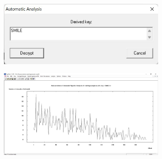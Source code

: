 \documentclass{article}
\begin{document}
\begin{figure}[H]
    \centering
    \includegraphics[width=0.75\textwidth]{figures/4c.jpg}
    \caption
	{}
    \label{fig:fig1}
\end{figure}

\begin{figure}[H]
    \centering
    \includegraphics[width=0.75\textwidth]{figures/4d.jpg}
    \caption
	{}
    \label{fig:fig1}
\end{figure}
\end{document}
